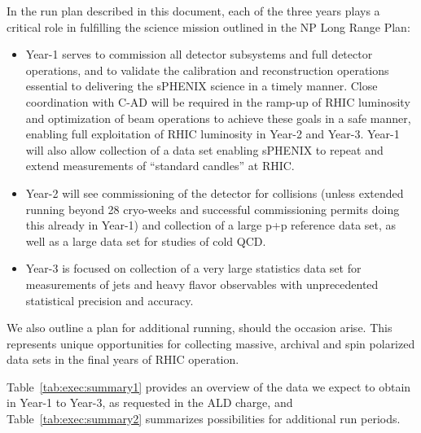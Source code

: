 In the run plan described in this document, each of the three years
plays a critical role in fulfilling the science mission outlined in
the NP Long Range Plan:
\begin{itemize}
\item Year-1 serves to commission all detector subsystems and full
  detector operations, and to validate the calibration and
  reconstruction operations essential to delivering the sPHENIX
  science in a timely manner. Close coordination with C-AD will be
  required in the ramp-up of RHIC luminosity and optimization of beam
  operations to achieve these goals in a safe manner, enabling full
  exploitation of RHIC luminosity in Year-2 and Year-3. Year-1 will
  also allow collection of a \auau data set enabling sPHENIX to repeat
  and extend measurements of ``standard candles'' at RHIC.
\item Year-2 will see commissioning of the detector for \pp collisions
  (unless extended running beyond 28 cryo-weeks and successful \auau
  commissioning permits doing this already in Year-1) and collection
  of a large p+p reference data set, as well as a large \pAu data set
  for studies of cold QCD.
\item Year-3 is focused on collection of a very large statistics \auau
  data set for measurements of jets and heavy flavor observables with
  unprecedented statistical precision and accuracy.
\end{itemize}

We also outline a plan for additional running, should the occasion
arise. This represents unique opportunities for collecting massive,
archival \auau and spin polarized \pp data sets in the final years of
RHIC operation.

Table~\ref{tab:exec:summary1} provides an overview of the data we
expect to obtain in Year-1 to Year-3, as requested in the ALD charge,
and Table~\ref{tab:exec:summary2} summarizes possibilities for
additional run periods.

